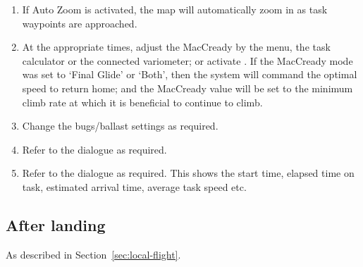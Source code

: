 \begin{enumerate}
\item If Auto Zoom is activated, the map will automatically zoom in as task
  waypoints are approached.

\item  At the appropriate times, adjust the MacCready by the menu,
  the task calculator or the connected variometer; or activate .
  If the MacCready mode was set to `Final Glide' or `Both', then the system will
  command the optimal   speed to return home; and the MacCready value will be
  set to the minimum climb rate at which it is beneficial to continue to climb.

\item  Change the bugs/ballast settings as required.
\item  Refer to the  dialogue as required.
\item  Refer to the  dialogue as required.  This shows the start
  time, elapsed time on task, estimated arrival time, average task speed etc.
\end{enumerate}

\subsection*{After landing}
As described in Section~\ref{sec:local-flight}.


